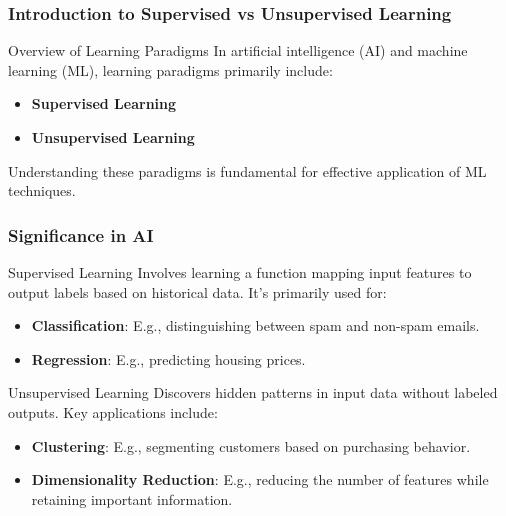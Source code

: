 \documentclass[aspectratio=169]{beamer}
\begin{document}
\frame{\titlepage}

\begin{frame}[fragile]
    \frametitle{Introduction to Supervised vs Unsupervised Learning}
    \begin{block}{Overview of Learning Paradigms}
        In artificial intelligence (AI) and machine learning (ML), learning paradigms primarily include:
        \begin{itemize}
            \item \textbf{Supervised Learning}
            \item \textbf{Unsupervised Learning}
        \end{itemize}
        Understanding these paradigms is fundamental for effective application of ML techniques.
    \end{block}
\end{frame}

\begin{frame}[fragile]
    \frametitle{Significance in AI}
    \begin{block}{Supervised Learning}
        Involves learning a function mapping input features to output labels based on historical data. It's primarily used for:
        \begin{itemize}
            \item \textbf{Classification}: E.g., distinguishing between spam and non-spam emails.
            \item \textbf{Regression}: E.g., predicting housing prices.
        \end{itemize}
    \end{block}
    
    \begin{block}{Unsupervised Learning}
        Discovers hidden patterns in input data without labeled outputs. Key applications include:
        \begin{itemize}
            \item \textbf{Clustering}: E.g., segmenting customers based on purchasing behavior.
            \item \textbf{Dimensionality Reduction}: E.g., reducing the number of features while retaining important information.
        \end{itemize}
    \end{block}
\end{frame}
\end{document}
